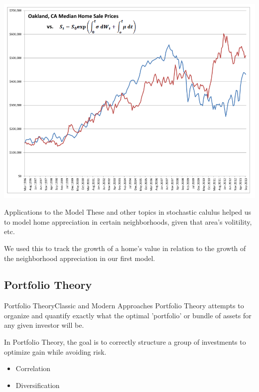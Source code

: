 \documentclass{beamer}
\begin{document}
\begin{frame}
\includegraphics[scale = .45]{lognormal.png}
\end{frame}

\begin{frame}{Applications to the Model}
These and other topics in stochastic calulus helped us to model home appreciation in certain neighborhoods, given that area's volitility, etc. \bigskip

\pause
We used this to track the growth of a home's value in relation to the growth of the neighborhood appreciation in our first model.\\

\end{frame}

\subsection{Portfolio Theory}


\begin{frame}{Portfolio Theory}{Classic and Modern Approaches}
Portfolio Theory attempts to organize and quantify exactly what the optimal 'portfolio' or bundle of assets for any given investor will be.\bigskip

\pause
In Portfolio Theory, the goal is to correctly structure a group of investments to optimize gain while avoiding risk.
\pause
\begin{itemize}
\item
Correlation
\item
Diversification
\end{itemize}
\end{frame}
\end{document}
